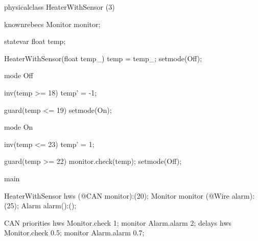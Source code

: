 physicalclass HeaterWithSensor (3)
{
    knownrebecs {
        Monitor monitor;
    }

    statevar {
        float temp;
    }

    HeaterWithSensor(float temp_) {
        temp = temp_;
        setmode(Off);
    }

    mode Off {
        inv(temp >= 18) {
            temp' = -1;
        }

        guard(temp <= 19) {
            setmode(On);
        }
    }

    mode On {
        inv(temp <= 23) {
            temp' = 1;
        }

        guard(temp >= 22) {
            monitor.check(temp);
            setmode(Off);
        }
    }
}

main
{
   HeaterWithSensor hws
        (@CAN monitor):(20);
   Monitor monitor (@Wire alarm):(25);
   Alarm alarm():();
   
   	CAN{
	   priorities{
			hws	     Monitor.check		1;
			monitor  Alarm.alarm		2;
		}
	   delays{
			hws	     Monitor.check		0.5;
			monitor  Alarm.alarm		0.7;}
}}

